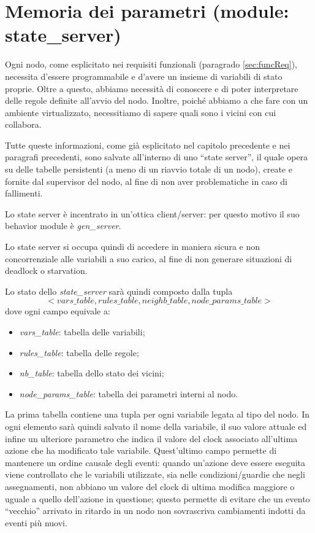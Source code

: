 \documentclass[italian]{memoir}
\begin{document}
\section{Memoria dei parametri (module: state\_server)}
Ogni nodo, come esplicitato nei requisiti funzionali (paragrado \ref{sec:funcReq}), necessita d'essere programmabile e d'avere un insieme di variabili di stato proprie. Oltre a questo, abbiamo necessità di conoscere e di poter interpretare delle regole definite all'avvio del nodo. Inoltre, poiché abbiamo a che fare con un ambiente virtualizzato, necessitiamo di sapere quali sono i vicini con cui collabora.

Tutte queste informazioni, come già esplicitato nel capitolo precedente e nei paragrafi precedenti, sono salvate all'interno di uno ``state server'', il quale opera su delle tabelle persistenti (a meno di un riavvio totale di un nodo), create e fornite dal supervisor del nodo, al fine di non aver problematiche in caso di fallimenti.

Lo state server è incentrato in un'ottica client/server: per questo motivo il suo behavior module è \textit{gen\_server}.

Lo state server si occupa quindi di accedere in maniera sicura e non concorrenziale alle variabili a suo carico, al fine di non generare situazioni di deadlock o starvation.

Lo stato dello \textit{state\_server} sarà quindi composto dalla tupla
$$
    <vars\_table, rules\_table, neighb\_table, node\_params\_table>
$$
dove ogni campo equivale a:
\begin{itemize}
    \item \textit{vars\_table}: tabella delle variabili;
    \item \textit{rules\_table}: tabella delle regole;
    \item \textit{nb\_table}: tabella dello stato dei vicini;
    \item \textit{node\_params\_table}: tabella dei parametri interni al nodo.
\end{itemize}

La prima tabella contiene una tupla per ogni variabile legata al tipo del nodo. In ogni elemento sarà quindi salvato il nome della variabile, il suo valore attuale ed infine un ulteriore parametro che indica il valore del clock associato all'ultima azione che ha modificato tale variabile. Quest'ultimo campo permette di mantenere un ordine causale degli eventi: quando un'azione deve essere eseguita viene controllato che le variabili utilizzate, sia nelle condizioni/guardie che negli assegnamenti, non abbiano un valore del clock di ultima modifica maggiore o uguale a quello dell'azione in questione; questo permette di evitare che un evento ``vecchio'' arrivato in ritardo in un nodo non sovrascriva cambiamenti indotti da eventi più nuovi. 
\end{document}
